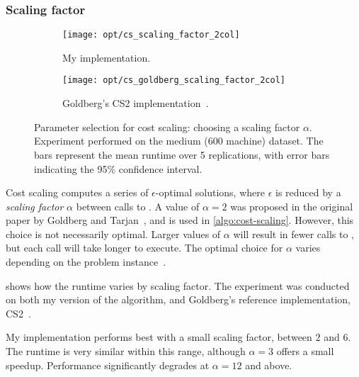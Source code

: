 
\subsubsection{Scaling factor} \label{sec:eval-optimisations-cs-scaling-factor}

\begin{figure}
    \begin{widepage}
    \begin{subfigure}[c]{0.5\textwidth}
        \texttt{[image: opt/cs\_scaling\_factor\_2col]}
        \caption{My implementation.}
    \end{subfigure}
    \begin{subfigure}[c]{0.5\textwidth}
        \texttt{[image: opt/cs\_goldberg\_scaling\_factor\_2col]}
        \caption{Goldberg's CS2 implementation~\cite{Goldberg:1987,CS2:2009}.}
    \end{subfigure}
    \end{widepage}
    \caption[Parameter selection for cost scaling]{Parameter selection for cost scaling: choosing a scaling factor $\alpha$. Experiment performed on the medium (600 machine) dataset. The bars represent the mean runtime over 5 replications, with error bars indicating the 95\% confidence interval.}
    \label{fig:opt-cs-scaling-factor}
\end{figure}

Cost scaling computes a series of $\epsilon$-optimal solutions, where $\epsilon$ is reduced by a \emph{scaling factor} $\alpha$ between calls to . A value of $\alpha=2$ was proposed in the original paper by Goldberg and Tarjan~\cite{Goldberg:1987}, and is used in \cref{algo:cost-scaling}. However, this choice is not necessarily optimal. Larger values of $\alpha$ will result in fewer calls to , but each call will take longer to execute. The optimal choice for $\alpha$ varies depending on the problem instance~\cite[\S7]{Goldberg:1997}.

 shows how the runtime varies by scaling factor. %
The experiment was conducted on both my version of the algorithm, and Goldberg's reference implementation, CS2~\cite{CS2:2009}.

My implementation performs best with a small scaling factor, between $2$ and $6$. The runtime is very similar within this range, although $\alpha=3$ offers a small speedup. Performance significantly degrades at $\alpha = 12$ and above.

